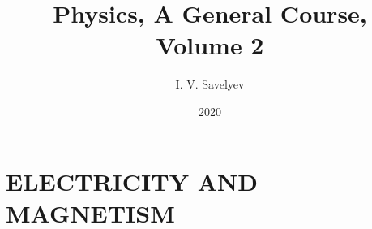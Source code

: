 \documentclass[12pt, b5paper, twoside, fleqn]{book}
\title{Physics, A General Course, Volume 2}
\author{I. V. Savelyev}
\date{2020}
\numberwithin{equation}{chapter}
\begin{document}
\setlength{\abovedisplayskip}{3pt}
\setlength{\belowdisplayskip}{3pt}
\setlength{\abovedisplayshortskip}{3pt}
\setlength{\belowdisplayshortskip}{3pt}

\frontmatter


\cleardoublepage

\cleardoublepage

\cleardoublepage
{\hypersetup{linkcolor=black!80}
	\tableofcontents
}
\cleardoublepage

\mainmatter

% 

\part{ELECTRICITY AND MAGNETISM}\label{part:A}
\cleardoublepage
%
\cleardoublepage
%
\cleardoublepage
%
\cleardoublepage
%
\cleardoublepage
%
\cleardoublepage
%
\cleardoublepage
%
\cleardoublepage
%
\cleardoublepage
%
\cleardoublepage
%
\cleardoublepage
%
\cleardoublepage
%
\cleardoublepage
%
\cleardoublepage

\cleardoublepage
%
\cleardoublepage
%
\cleardoublepage

\cleardoublepage
%
\cleardoublepage
%
\cleardoublepage
%
\cleardoublepage
%
\cleardoublepage
%
\cleardoublepage
%
\cleardoublepage
%
\printindex

\cleardoublepage

\end{document}
